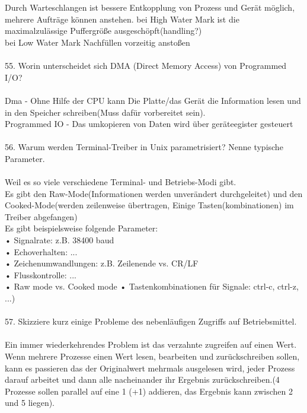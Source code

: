 \documentclass{article}
\newcommand\tab[1][1cm]{\hspace*{#1}}
\begin{document}
\\
\\
Durch Warteschlangen ist bessere Entkopplung von Prozess und Ger\"at m\"oglich, mehrere Auftr\"age k\"onnen anstehen.
\tab bei High Water Mark ist die maximalzul\"assige Puffergr\"o\ss e ausgesch\"opft(handling?)\\
\tab bei Low Water Mark Nachf\"ullen vorzeitig ansto\ss en
\\
\\
55. Worin unterscheidet sich DMA (Direct Memory Access) von Programmed I/O?
\\
\\
Dma - Ohne Hilfe der CPU kann Die Platte/das Ger\"at die Information lesen und in den Speicher schreiben(Muss daf\"ur vorbereitet sein).\\
Programmed IO - Das umkopieren von Daten wird \"uber ger\"ateegister gesteuert
\\
\\
56. Warum werden Terminal-Treiber in Unix parametrisiert? Nenne typische Parameter.
\\
\\
Weil es so viele verschiedene Terminal- und Betriebs-Modi gibt.\\
Es gibt den Raw-Mode(Informationen werden unver\"andert durchgeleitet) und den Cooked-Mode(werden zeilenweise \"ubertragen, Einige Tasten(kombinationen) im Treiber abgefangen)\\
Es gibt beispielsweise folgende Parameter:\\
• Signalrate: z.B. 38400 baud\\
• Echoverhalten: ...\\
• Zeichenumwandlungen: z.B. Zeilenende vs. CR/LF\\
• Flusskontrolle: ...\\
• Raw mode vs. Cooked mode
• Tastenkombinationen für Signale: ctrl-c, ctrl-z, ...)
\\
\\
57. Skizziere kurz einige Probleme des nebenläufigen Zugriffs auf Betriebsmittel.
\\
\\
Ein immer wiederkehrendes Problem ist das verzahnte zugreifen auf einen Wert. Wenn mehrere Prozesse einen Wert lesen, bearbeiten und zur\"uckschreiben sollen, kann es passieren das der Originalwert mehrmals ausgelesen wird, jeder Prozess darauf arbeitet und dann alle nacheinander ihr Ergebnis zur\"uckschreiben.(4 Prozesse sollen parallel auf eine 1 (+1) addieren, das Ergebnis kann zwischen 2 und 5 liegen).
\end{document}
